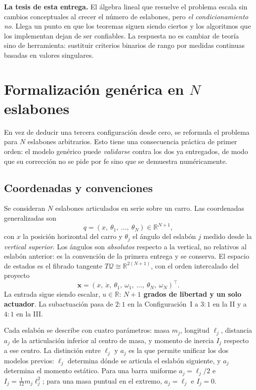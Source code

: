 \documentclass[11pt,letterpaper]{article}
\theoremstyle{definition}
\theoremstyle{plain}
\theoremstyle{remark}
\newcommand{\R}{\mathbb{R}}
\newcommand{\xv}{\bm{x}}
\begin{document}
\begin{clave}
\small
\textbf{La tesis de esta entrega.} El álgebra lineal que resuelve el problema
escala sin cambios conceptuales al crecer el número de eslabones, pero
\emph{el condicionamiento no}. Llega un punto en que los teoremas siguen siendo
ciertos y los algoritmos que los implementan dejan de ser confiables. La
respuesta no es cambiar de teoría sino de herramienta: sustituir criterios
binarios de rango por medidas continuas basadas en valores singulares.
\end{clave}

\section{Formalización genérica en $N$ eslabones}
\label{sec:generico}

En vez de deducir una tercera configuración desde cero, se reformula el problema
para $N$ eslabones arbitrarios. Esto tiene una consecuencia práctica de primer
orden: el modelo genérico puede \emph{validarse} contra los dos ya entregados, de
modo que su corrección no se pide por fe sino que se demuestra numéricamente.

\subsection{Coordenadas y convenciones}

Se consideran $N$ eslabones articulados en serie sobre un carro. Las coordenadas
generalizadas son
\[
q=(x,\ \theta_1,\ \dots,\ \theta_N)\in\R^{N+1},
\]
con $x$ la posición horizontal del carro y $\theta_j$ el ángulo del eslabón $j$
medido desde la \emph{vertical superior}. Los ángulos son \emph{absolutos}
respecto a la vertical, no relativos al eslabón anterior: es la convención de la
primera entrega y se conserva. El espacio de estados es el fibrado tangente
$T\mathcal{Q}\cong\R^{2(N+1)}$, con el orden intercalado del proyecto
\[
\xv=(x,\ \dot x,\ \theta_1,\ \omega_1,\ \dots,\ \theta_N,\ \omega_N)^{\!\top}.
\]
La entrada sigue siendo escalar, $u\in\R$: \textbf{$N+1$ grados de libertad y un
solo actuador}. La subactuación pasa de $2\!:\!1$ en la Configuración~I a
$3\!:\!1$ en la II y a $4\!:\!1$ en la III.

Cada eslabón se describe con cuatro parámetros: masa $m_j$, longitud $\ell_j$,
distancia $a_j$ de la articulación inferior al centro de masa, y momento de
inercia $I_j$ respecto a ese centro. La distinción entre $\ell_j$ y $a_j$ es la
que permite unificar los dos modelos previos: $\ell_j$ determina dónde se
articula el eslabón siguiente, y $a_j$ determina el momento estático. Para una
barra uniforme $a_j=\ell_j/2$ e $I_j=\tfrac{1}{12}m_j\ell_j^2$; para una masa
puntual en el extremo, $a_j=\ell_j$ e $I_j=0$.
\end{document}
